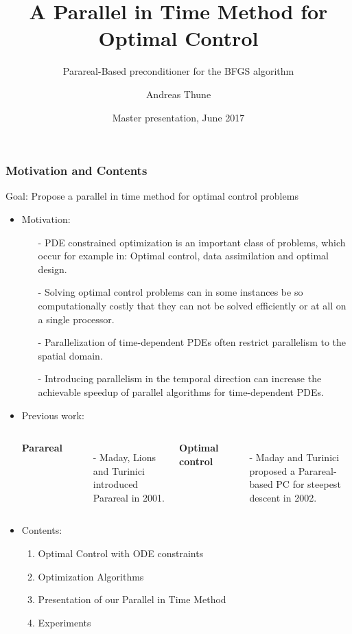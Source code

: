 \documentclass[9pt]{beamer}
\title{A Parallel in Time Method for Optimal Control}
\subtitle{Parareal-Based preconditioner for the BFGS algorithm}
\author{Andreas Thune}
\institute[UiO]{Faculty of Mathematics \\University of Oslo,\\Simula Research Laboratory}
\date{Master presentation, June 2017}
\begin{document}
 
\frame{\titlepage}
\begin{frame}
\frametitle{Motivation and Contents}
\begin{block}{}
\centering
\alert{Goal}: Propose a parallel in time method for optimal control problems
\end{block}
\begin{itemize}
\item{Motivation:
\begin{itemize}
\item[-]{PDE constrained optimization is an important class of problems, which occur for example in: Optimal control, data assimilation and optimal design.}
\item[-]{Solving optimal control problems can in some instances be so computationally costly that they can not be solved efficiently or at all on a single processor.}
\item[-]{Parallelization of time-dependent PDEs often restrict parallelism to the spatial domain.}
\item[-]{Introducing parallelism in the temporal direction can increase the achievable speedup of parallel algorithms for time-dependent PDEs. }
\end{itemize}}
\item{Previous work:
\begin{columns}
\textbf{Parareal}
\begin{itemize}
\item[-]{Maday, Lions and Turinici introduced Parareal in 2001.}
\end{itemize}
\textbf{Optimal control}
\begin{itemize}
\item[-]{Maday and Turinici proposed a Parareal-based PC for steepest descent in 2002. }
\end{itemize}
\end{columns}
}
\item{Contents:
\begin{enumerate}[I]
\item{Optimal Control with ODE constraints}
\item{Optimization Algorithms}
\item{Presentation of our Parallel in Time Method}
\item{Experiments}
\end{enumerate}}
\end{itemize}
\end{frame}
\end{document}
